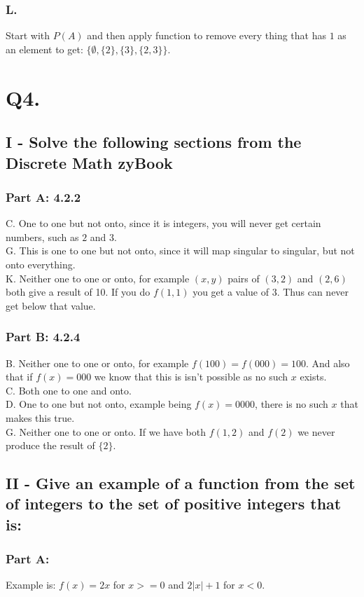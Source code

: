\documentclass[titlepage]{article}\pagestyle{empty}
\begin{document}
\subsubsection*{L.} 
Start with $P(A)$ and then apply function to remove every thing that has $1$ as an element to get: $\{\emptyset, \{2\}, \{3\}, \{2, 3\}\}.$

\pagebreak
\section*{Q4.}
\subsection*{I - Solve the following sections from the Discrete Math zyBook} 
\subsubsection*{Part A: 4.2.2}
C. One to one but not onto, since it is integers, you will never get certain numbers, such as $2$ and $3$.\\
G. This is one to one but not onto, since it will map singular to singular, but not onto everything. \\
K. Neither one to one or onto, for example $(x,y)$ pairs of $(3,2)$ and $(2, 6)$ both give a result of 10. If you do $f(1, 1)$ you get a value of 3. Thus can never get below that value.
\subsubsection*{Part B: 4.2.4}
B. Neither one to one or onto, for example $f(100) = f(000) = 100$. And also that if $f(x) = 000$ we know that this is isn't possible as no such $x$ exists.\\
C. Both one to one and onto.\\
D. One to one but not onto, example being $f(x) = 0000$, there is no such $x$ that makes this true.\\
G. Neither one to one or onto. If we have both $f(1,2)$ and $f(2)$ we never produce the result of $\{2\}$.
\subsection*{II - Give an example of a function from the set of integers to the set of positive integers that is: }  
\subsubsection*{Part A:}
Example is: $f(x) = 2x$ for $x >= 0$ and $2|x|+1$ for $x < 0$.
\end{document}
